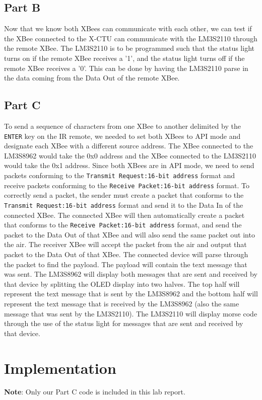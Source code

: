 \documentclass[11pt, titlepage]{article}
\begin{document}
        \subsection{Part B}
            Now that we know both XBees can communicate with each other, we can test if the XBee connected to the X-CTU can communicate with the LM3S2110 through the remote XBee. The LM3S2110 is to be programmed such that the status light turns on if the remote XBee receives a '1', and the status light turns off if the remote XBee receives a '0'. This can be done by having the LM3S2110 parse in the data coming from the Data Out of the remote XBee.
        
        \subsection{Part C}
            To send a sequence of characters from one XBee to another delimited by the \texttt{ENTER} key on the IR remote, we needed to set both XBees to API mode and designate each XBee with a different source address. The XBee connected to the LM3S8962 would take the 0x0 address and the XBee connected to the LM3S2110 would take the 0x1 address. Since both XBees are in API mode, we need to send packets conforming to the \texttt{Transmit Request:16-bit address} format and receive packets conforming to the \texttt{Receive Packet:16-bit address} format. To correctly send a packet, the sender must create a packet that conforms to the \texttt{Transmit Request:16-bit address} format and send it to the Data In of the connected XBee. The connected XBee will then automatically create a packet that conforms to the \texttt{Receive Packet:16-bit address} format, and send the packet to the Data Out of that XBee and will also send the same packet out into the air. The receiver XBee will accept the packet from the air and output that packet to the Data Out of that XBee. The connected device will parse through the packet to find the payload. The payload will contain the text message that was sent. The LM3S8962 will display both messages that are sent and received by that device by splitting the OLED display into two halves. The top half will represent the text message that is sent by the LM3S8962 and the bottom half will represent the text message that is received by the LM3S8962 (also the same message that was sent by the LM3S2110). The LM3S2110 will display morse code through the use of the status light for messages that are sent and received by that device.
    
    \section{Implementation}
        \textbf{Note}: Only our Part C code is included in this lab report.
\end{document}
